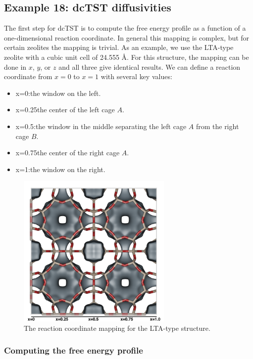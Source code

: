 \subsection*{Example 18: dcTST diffusivities}

The first step for dcTST is to compute the free energy profile as a function of a one-dimensional reaction coordinate.
In general this mapping is complex, but for certain zeolites the mapping is trivial.
As an example, we use the LTA-type zeolite with a cubic unit cell of 24.555 \AA.
For this structure, the mapping can be done in $x$, $y$, or $z$ and all three give identical results.
We can define a reaction coordinate from $x=0$ to $x=1$ with several key values:
\begin{itemize}
 \item{x=0}:\quad the window on the left.
 \item{x=0.25}\quad the center of the left cage $A$.
 \item{x=0.5}:\quad the window in the middle separating the left cage $A$ from the right cage $B$.
 \item{x=0.75}\quad the center of the right cage $A$.
 \item{x=1}:\quad the window on the right.
\end{itemize}

\begin{figure}[t]
  \centering
  \includegraphics[width=7.5cm]{./Examples/Figures/LTA_dcTST.png}
  \caption{The reaction coordinate mapping for the LTA-type structure.}
  \label{Fig: LTA dcTST}
\end{figure}

\subsubsection{Computing the free energy profile}

